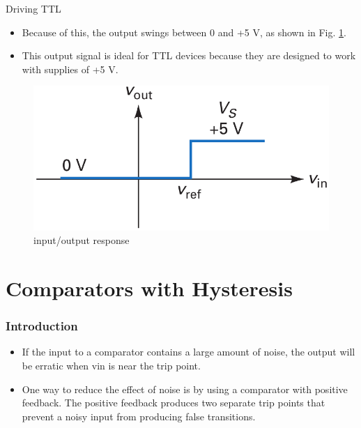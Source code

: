 \documentclass[pdflatex,compress]{beamer}
\begin{document}
\begin{frame}{Driving TTL}
	\begin{multicols}{2}
		\begin{itemize}
			\item Because of this, the output swings between 0 and +5 V, as shown in Fig. \ref{fig:2014b}.
			\item This output signal is ideal for TTL devices because they are designed to work with supplies of +5 V.
		\end{itemize}
		\vfill\null
		\begin{figure}
			\centering
			\includegraphics[width=\linewidth]{img/2014b}
			\caption{input/output response}
			\label{fig:2014b}
		\end{figure}
	\end{multicols}
\end{frame}

\section{Comparators with Hysteresis}

\begin{frame}
	\frametitle{Introduction}
	\begin{itemize}
		\item If the input to a comparator contains a large amount of noise, the output will be erratic when vin is near the trip point.
		\item One way to reduce the effect of noise is by using a comparator with positive feedback. The positive feedback produces two separate trip points that prevent a noisy input from producing false transitions.
	\end{itemize}
\end{frame}
\end{document}
